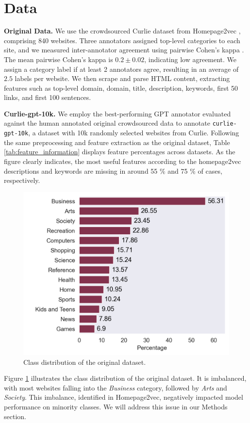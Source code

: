 \section{Data}\label{sec:data}

\textbf{Original Data.} We use the crowdsourced Curlie dataset from Homepage2vec \cite{homepage2vec}, comprising 840 websites. Three annotators assigned top-level categories to each site, and we measured inter-annotator agreement using pairwise Cohen's kappa \cite{cohen-coef}. The mean pairwise Cohen's kappa is $0.2 \pm 0.02$, indicating low agreement. We assign a category label if at least 2 annotators agree, resulting in an average of $2.5$ labels per website. We then scrape and parse HTML content, extracting features such as top-level domain, domain, title, description, keywords, first 50 links, and first 100 sentences.



\textbf{Curlie-gpt-10k.} We employ the best-performing GPT annotator evaluated against the human annotated original crowdsourced data to annotate \texttt{curlie-gpt-10k}, a dataset with 10k randomly selected websites from Curlie. Following the same preprocessing and feature extraction as the original dataset, Table \ref{tab:feature_information} displays feature percentages across datasets. As the figure clearly indicates, the most useful features according to the homepage2vec \cite{homepage2vec} descriptions and keywords are missing in around 55 \% and 75 \% of cases, respectively. 

\begin{figure}[!ht]
    \centering
    \includegraphics[width=1\columnwidth]{figures/category_distribution.png}
    \caption{Class distribution of the original dataset.}
    \label{fig:class_distribution}
\end{figure}

Figure \ref{fig:class_distribution} illustrates the class distribution of the original dataset. It is imbalanced, with most websites falling into the \textit{Business} category, followed by \textit{Arts} and \textit{Society}. This imbalance, identified in Homepage2vec, negatively impacted model performance on minority classes. We will address this issue in our Methods section.